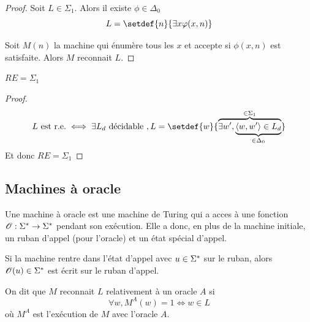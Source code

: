 \begin{proof}

	Soit $L \in \Sigma_1$. Alors il existe $\phi \in \Delta_0$ \tq
	$$ L = \setdef {n} {\exists x \phi(x,n)} $$

	Soit $M(n)$ la machine qui énumère tous les $x$ et accepte si $\phi(x,n)$ est satisfaite.
	Alors $M$ reconnait $L$.
\end{proof}


\iffalse
	\begin{prop}
		$L$ est r.e. $\implies L \in \Sigma_1$.
	\end{prop}

	\begin{proof}
		\begin{eqnarray*}
			L \text{ est r.e.} &\iff& (\forall w, w \in L \iff \exists x, eval (\encode M,w,x) = 1)\\
			&\implies& L \in \Sigma_1
		\end{eqnarray*}
	\end{proof}
\fi


\begin{prop} \label{prop:sigma-re}
	$RE = \Sigma_1$
\end{prop}

\begin{proof}
	$$L \text{ est r.e.} \iff \exists L_d \text{ décidable }, L = \setdef {w} {\overbrace{\exists w', \underbrace{\encode {w, w'} \in L_d}_{\in \Delta_0}}^{\in \Sigma_1}}$$
	Et donc $RE = \Sigma_1$
\end{proof}

\subsection{Machines à oracle}

\begin{definition}
	Une machine à oracle est une machine de Turing qui a acces à une fonction $\mathscr O : \Sigma^{*} \to \Sigma^{*}$ pendant son exécution. Elle a donc, en plus de la machine
	initiale, un ruban d'appel (pour l'oracle) et un état spécial d'appel.

	Si la machine rentre dans l'état d'appel avec $u \in \Sigma^{*}$ sur le ruban, alors $\mathscr O (u) \in \Sigma^{*}$ est écrit sur le ruban d'appel.
\end{definition}

\begin{definition}[Reconnaissance]

	On dit que $M$ reconnait $L$ relativement à un oracle $A$ si
	$$ \forall w, M^A (w) = 1 \iff w \in L $$
	où $M^A$ est l'exécution de $M$ avec l'oracle $A$.

\end{definition}


